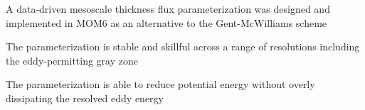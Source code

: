\documentclass[draft]{agujournal2019}
\begin{document}





\begin{keypoints}
\item A data-driven mesoscale thickness flux parameterization was designed and implemented in MOM6 as an alternative to the Gent-McWilliams scheme 
\item The parameterization is stable and skillful across a range of resolutions including the eddy-permitting gray zone
\item The parameterization is able to reduce potential energy without overly dissipating the resolved eddy energy
\end{keypoints}

%
%

%
%
\end{document}
